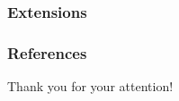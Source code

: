 \documentclass{beamer}
\begin{document}
\begin{frame}[t]\frametitle{Extensions}

\begin{table}[tb]\tiny
    \label{tab:tablename}
    \centering

    
\end{table}

\end{frame}


\begin{frame}[allowframebreaks]\frametitle{References}

\printbibliography

\end{frame}

\begin{frame}[plain, c]

\centering
Thank you for your attention!

\end{frame}

\bgroup
{}
\begin{frame}[plain]{}
\end{frame}
\egroup
\end{document}
